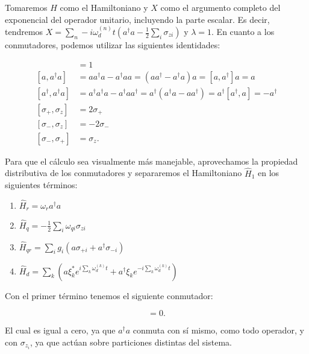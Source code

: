 Tomaremos $H$ como el Hamiltoniano y $X$ como el argumento completo del exponencial del operador unitario, incluyendo la parte escalar. Es decir, tendremos $X = \sum\limits_n-i \omega_d^{(n)} t(a^\dagger a - \frac{1}{2} \sum\limits_i \sigma_{z i})$ y $\lambda = 1$. En cuanto a los conmutadores, podemos utilizar las siguientes identidades:

\begin{align}
    [a, a^\dagger] &= 1
    \label{eq:a_ad} \\
    [a, a^\dagger a] &= a a^\dagger a - a^\dagger a a = (a a^\dagger - a^\dagger a) a = [a, a^\dagger] a = a
    \label{eq:a_ada} \\
    [a^\dagger, a^\dagger a] &= a^\dagger a^\dagger a - a^\dagger a a^\dagger = a^\dagger (a^\dagger a - a a^\dagger) = a^\dagger [a^\dagger, a] = -a^\dagger
    \label{eq:ad_ada} \\
    [\sigma_+, \sigma_z] &= 2 \sigma_+
    \label{eq:sp_sz} \\
    [\sigma_-, \sigma_z] &= - 2 \sigma_-
    \label{eq:sm_sz} \\
    [\sigma_-, \sigma_+] &= \sigma_z .
    \label{eq:sm_sp}
\end{align}

Para que el cálculo sea visualmente más manejable, aprovechamos la propiedad distributiva de los conmutadores y separaremos el Hamiltoniano $\hat{H}_1$ en los siguientes términos:

\begin{enumerate}
    \item $\hat{H}_r = \omega_r a^\dag a$
    \item $\hat{H}_q = - \frac{1}{2} \sum\limits_i \omega_{qi} \sigma_{zi}$
    \item $\hat{H}_{qr} = \sum\limits_i g_i (a \sigma_{+ i} + a^\dagger \sigma_{- i})$
    \item $\hat{H}_d = \sum\limits_k (a\xi_k^*e^{i\sum\limits_k \omega_d^{(k)}t}+ a^\dagger\xi_ke^{-i\sum\limits_k \omega_d^{(k)}t})$
\end{enumerate}


Con el primer término tenemos el siguiente conmutador:

\begin{equation}
    [\omega_r a^\dag a, X] = 0 .
\end{equation}

El cual es igual a cero, ya que $a^\dagger a$ conmuta con sí mismo, como todo operador, y con $\sigma_{z_i}$, ya que actúan sobre particiones distintas del sistema.


